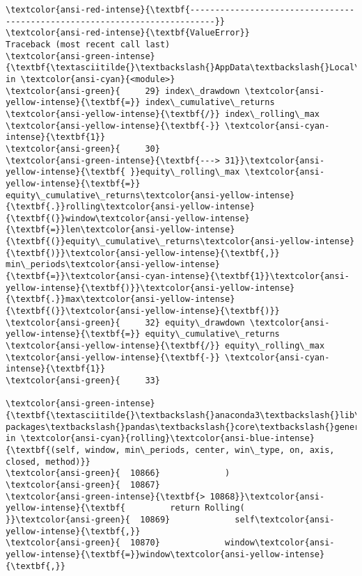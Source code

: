 \documentclass[11pt]{article}
\begin{document}
    \begin{Verbatim}[commandchars=\\\{\}, frame=single, framerule=2mm, rulecolor=\color{outerrorbackground}]
\textcolor{ansi-red-intense}{\textbf{---------------------------------------------------------------------------}}
\textcolor{ansi-red-intense}{\textbf{ValueError}}                                Traceback (most recent call last)
\textcolor{ansi-green-intense}{\textbf{\textasciitilde{}\textbackslash{}AppData\textbackslash{}Local\textbackslash{}Temp/ipykernel\_38628/737027540.py}} in \textcolor{ansi-cyan}{<module>}
\textcolor{ansi-green}{     29} index\_drawdown \textcolor{ansi-yellow-intense}{\textbf{=}} index\_cumulative\_returns \textcolor{ansi-yellow-intense}{\textbf{/}} index\_rolling\_max \textcolor{ansi-yellow-intense}{\textbf{-}} \textcolor{ansi-cyan-intense}{\textbf{1}}
\textcolor{ansi-green}{     30} 
\textcolor{ansi-green-intense}{\textbf{---> 31}}\textcolor{ansi-yellow-intense}{\textbf{ }}equity\_rolling\_max \textcolor{ansi-yellow-intense}{\textbf{=}} equity\_cumulative\_returns\textcolor{ansi-yellow-intense}{\textbf{.}}rolling\textcolor{ansi-yellow-intense}{\textbf{(}}window\textcolor{ansi-yellow-intense}{\textbf{=}}len\textcolor{ansi-yellow-intense}{\textbf{(}}equity\_cumulative\_returns\textcolor{ansi-yellow-intense}{\textbf{)}}\textcolor{ansi-yellow-intense}{\textbf{,}} min\_periods\textcolor{ansi-yellow-intense}{\textbf{=}}\textcolor{ansi-cyan-intense}{\textbf{1}}\textcolor{ansi-yellow-intense}{\textbf{)}}\textcolor{ansi-yellow-intense}{\textbf{.}}max\textcolor{ansi-yellow-intense}{\textbf{(}}\textcolor{ansi-yellow-intense}{\textbf{)}}
\textcolor{ansi-green}{     32} equity\_drawdown \textcolor{ansi-yellow-intense}{\textbf{=}} equity\_cumulative\_returns \textcolor{ansi-yellow-intense}{\textbf{/}} equity\_rolling\_max \textcolor{ansi-yellow-intense}{\textbf{-}} \textcolor{ansi-cyan-intense}{\textbf{1}}
\textcolor{ansi-green}{     33} 

\textcolor{ansi-green-intense}{\textbf{\textasciitilde{}\textbackslash{}anaconda3\textbackslash{}lib\textbackslash{}site-packages\textbackslash{}pandas\textbackslash{}core\textbackslash{}generic.py}} in \textcolor{ansi-cyan}{rolling}\textcolor{ansi-blue-intense}{\textbf{(self, window, min\_periods, center, win\_type, on, axis, closed, method)}}
\textcolor{ansi-green}{  10866}             )
\textcolor{ansi-green}{  10867} 
\textcolor{ansi-green-intense}{\textbf{> 10868}}\textcolor{ansi-yellow-intense}{\textbf{         return Rolling(
}}\textcolor{ansi-green}{  10869}             self\textcolor{ansi-yellow-intense}{\textbf{,}}
\textcolor{ansi-green}{  10870}             window\textcolor{ansi-yellow-intense}{\textbf{=}}window\textcolor{ansi-yellow-intense}{\textbf{,}}


\end{Verbatim}
\end{document}
